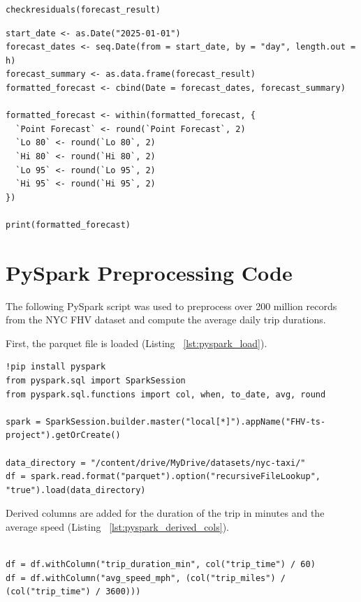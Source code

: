 \documentclass{article}
\begin{document}
\begin{lstlisting}[style=rstyle, caption={ 14-day Forecast Residuals}, label={lst:r_forecast_resid}]
checkresiduals(forecast_result)
\end{lstlisting}

\begin{lstlisting}[style=rstyle, caption={ Table of Forecasted Values}, label={lst:r_forecast_table}]
start_date <- as.Date("2025-01-01")
forecast_dates <- seq.Date(from = start_date, by = "day", length.out = h)
forecast_summary <- as.data.frame(forecast_result)
formatted_forecast <- cbind(Date = forecast_dates, forecast_summary)

formatted_forecast <- within(formatted_forecast, {
  `Point Forecast` <- round(`Point Forecast`, 2)
  `Lo 80` <- round(`Lo 80`, 2)
  `Hi 80` <- round(`Hi 80`, 2)
  `Lo 95` <- round(`Lo 95`, 2)
  `Hi 95` <- round(`Hi 95`, 2)
})

print(formatted_forecast)
\end{lstlisting}

\section{PySpark Preprocessing Code}
\label{appendix:pyspark}

The following PySpark script was used to preprocess over 200 million records from the NYC FHV dataset and compute the average daily trip durations.

First, the parquet file is loaded (Listing ~\ref{lst:pyspark_load}).

\begin{lstlisting}[style=pystyle, caption={Loading FHV Data from Parquet Files}, label={lst:pyspark_load}]
!pip install pyspark
from pyspark.sql import SparkSession
from pyspark.sql.functions import col, when, to_date, avg, round

spark = SparkSession.builder.master("local[*]").appName("FHV-ts-project").getOrCreate()

data_directory = "/content/drive/MyDrive/datasets/nyc-taxi/"
df = spark.read.format("parquet").option("recursiveFileLookup", "true").load(data_directory)

\end{lstlisting}

Derived columns are added for the duration of the trip in minutes and the average speed (Listing ~\ref{lst:pyspark_derived_cols}).

\begin{lstlisting}[style=pystyle, caption={Deriving Trip Duration and Average Speed Columns}, label={lst:pyspark_derived_cols}]

df = df.withColumn("trip_duration_min", col("trip_time") / 60)
df = df.withColumn("avg_speed_mph", (col("trip_miles") / (col("trip_time") / 3600)))

\end{lstlisting}
\end{document}
